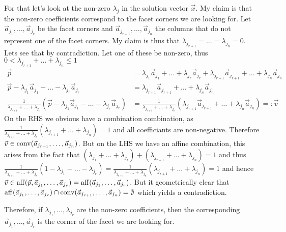 For that let's look at the non-zero $\lambda_j$ in the solution vector $\vec x$. My claim is that the non-zero coefficients correspond to the facet corners we are looking for. Let $\vec a_{j_1}, \dots, \vec a_{j_r}$ be the facet corners and $\vec a_{j_{r+1}}, \dots, \vec a_{j_n}$ the columns that do not represent one of the facet corners. My claim is thus that $\lambda_{j_{r+1}} = \dots = \lambda_{j_n} = 0$. Lets see that by contradiction. Let one of these be non-zero, thus $0 < \lambda_{j_{r+1}} + \dots + \lambda_{j_n} \leq 1$
\begin{align*}
    \vec p &= \lambda_{j_1}\vec a_{j_1} + \dots + \lambda_{j_r}\vec a_{j_r} + \lambda_{j_{r+1}}\vec a_{j_{r+1}} + \dots + \lambda_{j_n}\vec a_{j_n}\\
    \vec p  - \lambda_{j_1}\vec a_{j_1} - \dots - \lambda_{j_r}\vec a_{j_r} &= \lambda_{j_{r+1}}\vec a_{j_{r+1}} + \dots + \lambda_{j_n}\vec a_{j_n}\\
    \frac{1}{\lambda_{j_{r+1}} + \dots + \lambda_{j_n}}(\vec p  - \lambda_{j_1}\vec a_{j_1} - \dots - \lambda_{j_r}\vec a_{j_r}) &= \frac{1}{\lambda_{j_{r+1}} + \dots + \lambda_{j_n}}(\lambda_{j_{r+1}}\vec a_{j_{r+1}} + \dots + \lambda_{j_n}\vec a_{j_n}) =: \vec v
\end{align*}
On the RHS we obvious have a combination combination, as $\frac{1}{\lambda_{j_{r+1}} + \dots + \lambda_{j_n}}(\lambda_{j_{r+1}} + \dots + \lambda_{j_n}) = 1$ and all coefficiants are non-negative. Therefore $\vec v \in \operatorname{conv}(\vec a_{j_{r+1}}, \dots, \vec a_{j_n})$. But on the LHS we have an affine combination, this arises from the fact that $(\lambda_{j_1} + \dots + \lambda_{j_r}) + (\lambda_{j_{r+1}} + \dots + \lambda_{j_n}) = 1$ and thus $\frac{1}{\lambda_{j_{r+1}} + \dots + \lambda_{j_n}}(1 - \lambda_{j_1} - \dots - \lambda_{j_r}) = \frac{1}{\lambda_{j_{r+1}} + \dots + \lambda_{j_n}}(\lambda_{j_{r+1}} + \dots + \lambda_{j_n}) = 1$ and hence $\vec v \in \operatorname{aff}(\vec p, \vec a_{j_1}, \dots, \vec a_{j_r}) = \operatorname{aff}(\vec a_{j_1}, \dots, \vec a_{j_r})$. But it geometrically clear that $\operatorname{aff}(\vec a_{j_1}, \dots, \vec a_{j_r}) \cap \operatorname{conv}(\vec a_{j_{r+1}}, \dots, \vec a_{j_n}) = \emptyset$ which yields a contradiction.

Therefore, if $\lambda_{j_1}, \dots, \lambda_{j_r}$ are the non-zero coefficients, then the corresponding $\vec a_{j_1}, \dots, \vec a_{j_r}$ is the corner of the facet we are looking for.

